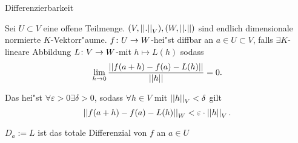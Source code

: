 \documentclass[class=article, crop=false]{standalone}
\begin{document}
\begin{zettel}{Differenzierbarkeit}
\begin{flashcard}
    \begin{definition}[differenzierbar]
        Sei $U \subset  V$ eine offene Teilmenge. $(V,\left|\left|.\right|\right|_V), (W,\left|\left|.\right|\right|)$ sind endlich dimensionale normierte $K$-Vektorr"aume. $f \colon U\to W$-hei"st diffbar an $a \in  U \subset  V$, falls $\exists  K$-lineare Abbildung $L \colon V\to W$-mit $h \mapsto L (h)$ sodass
\[
    \lim_{h \to 0} \frac{ \left|\left|f (a+h)- f (a)- L (h)\right|\right|}{ \left|\left|h\right|\right|} =0
.\]

Das hei"st $\forall\varepsilon>0 \exists\delta>0$, sodass $\forall h \in V$ mit $\left|\left|h\right|\right|_V < \delta$ gilt
\[
 \left|\left| f (a +h) - f (a)- L (h)\right|\right|_W < \varepsilon \cdot  \left|\left|h\right|\right|_V
.\]

$D_a := L $ ist das totale Differenzial von $f$  an $a \in  U$ 
\end{definition}


\end{flashcard}
\end{zettel}
\end{document}
